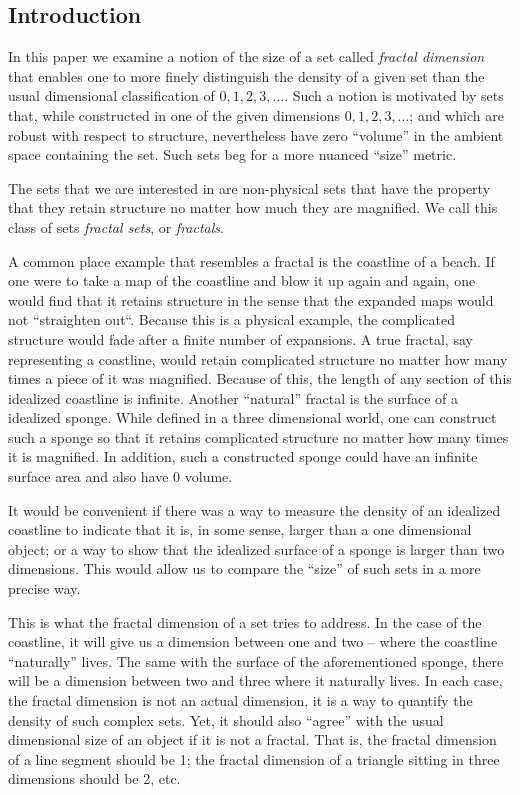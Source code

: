 \subsection{Introduction}
{\parindent=0pt
In this paper we examine a notion of the size of a set called 
{\it fractal dimension} that enables one to more
finely distinguish the density of a given set than the usual
dimensional classification of $0, 1, 2, 3, \ldots$.%
Such a notion is motivated by sets that, while constructed in one of the given
dimensions $0, 1, 2, 3, \dots$; and which are robust with respect to structure, 
nevertheless have zero ``volume'' in the ambient space containing the set.
Such sets beg for a more nuanced ``size'' metric.

The sets that we are interested in are non-physical sets that
have the property that they retain structure no matter how much 
they are magnified. We call this class of sets
{\it fractal sets}, or
{\it fractals}. 

A common place example that resembles a fractal is the coastline of
a beach. If one were to take a map of the coastline and blow it up
again and again, one would find that it retains structure in the
sense that the expanded maps would not ``straighten out``.
Because this is a physical example, the complicated structure would fade
after a finite number of expansions. A true fractal, say representing a 
coastline, would retain complicated
structure no matter how many times a piece of it was magnified.
Because of this, the length of any section of this idealized coastline is
infinite. Another ``natural'' fractal is the surface of a idealized sponge.
While defined in a three dimensional world, one can construct such a sponge so that
it retains complicated structure no matter how many times it is magnified.
In addition, such a constructed sponge could have an infinite surface area and 
also have 0 volume. 

It would be convenient if there was a way to
measure the density of an idealized coastline to
indicate that it is, in some sense, larger than a one dimensional
object; or a way to show that the idealized surface of a sponge is larger than
two dimensions. This would allow us to compare the ``size'' of such sets
in a more precise way.

This is what the fractal dimension of a set tries to address. 
In the case of the coastline, it will give us a dimension between one and two
-- where the coastline ``naturally'' lives. The same with the surface of
the aforementioned sponge,
there will be a dimension between two and three where it naturally lives. In
each case, the fractal dimension is not an actual dimension, 
it is a way to quantify the density of such complex sets.
Yet, it should also ``agree'' with the usual dimensional size of an object 
if it is not a fractal. That is, the fractal dimension of a line segment should 
be 1; the fractal dimension of a triangle sitting in three dimensions should 
be 2, etc.

}
